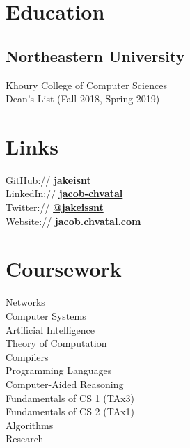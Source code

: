\documentclass[letterpaper]{cv} %
\begin{document}
\begin{minipage}[t]{0.33\textwidth} %

  \section{Education}
  \subsection{Northeastern University}
  Khoury College of Computer Sciences \\
  Dean's List (Fall 2018, Spring 2019) \\
  \sectionspace %

  \section{Links}
  GitHub://  \href{https://github.com/jakeisnt}{\bf jakeisnt} \\
  LinkedIn:// \href{https://www.linkedin.com/in/jacob-chvatal}{\bf jacob-chvatal} \\
  Twitter:// \href{https://twitter.com/jakeissnt}{\bf @jakeissnt} \\
  Website:// \href{https://wiki.chvatal.com}{\bf jacob.chvatal.com} \\
  \sectionspace

  \section{Coursework}
  Networks \\
  Computer Systems \\
  Artificial Intelligence \\
  Theory of Computation \\
  Compilers \\
  Programming Languages \\
  Computer-Aided Reasoning \\
  Fundamentals of CS 1 (TAx3) \\
  Fundamentals of CS 2 (TAx1) \\
  Algorithms \\
  Research


\end{minipage}
\end{document}
